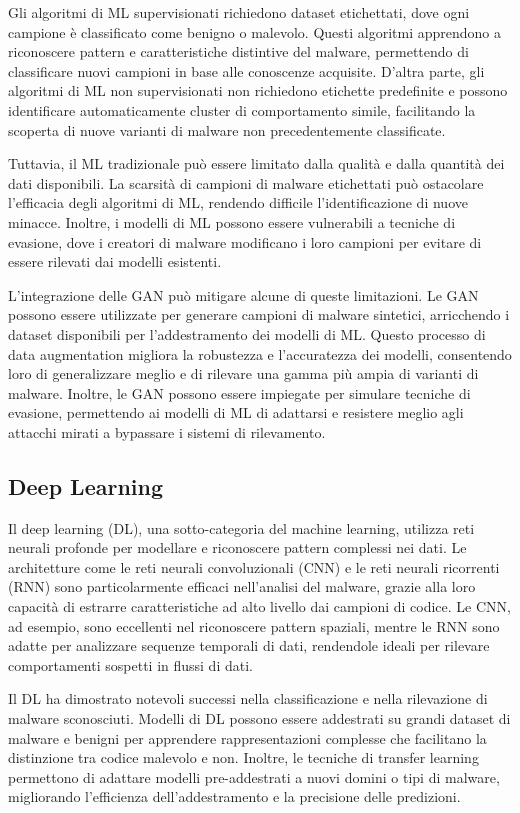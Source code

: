 Gli algoritmi di ML supervisionati richiedono dataset etichettati, dove ogni campione è classificato come benigno o malevolo. Questi algoritmi apprendono a riconoscere pattern e caratteristiche distintive del malware, permettendo di classificare nuovi campioni in base alle conoscenze acquisite. D'altra parte, gli algoritmi di ML non supervisionati non richiedono etichette predefinite e possono identificare automaticamente cluster di comportamento simile, facilitando la scoperta di nuove varianti di malware non precedentemente classificate.

Tuttavia, il ML tradizionale può essere limitato dalla qualità e dalla quantità dei dati disponibili. La scarsità di campioni di malware etichettati può ostacolare l'efficacia degli algoritmi di ML, rendendo difficile l'identificazione di nuove minacce. Inoltre, i modelli di ML possono essere vulnerabili a tecniche di evasione, dove i creatori di malware modificano i loro campioni per evitare di essere rilevati dai modelli esistenti.

L'integrazione delle GAN può mitigare alcune di queste limitazioni. Le GAN possono essere utilizzate per generare campioni di malware sintetici, arricchendo i dataset disponibili per l'addestramento dei modelli di ML. Questo processo di data augmentation migliora la robustezza e l'accuratezza dei modelli, consentendo loro di generalizzare meglio e di rilevare una gamma più ampia di varianti di malware. Inoltre, le GAN possono essere impiegate per simulare tecniche di evasione, permettendo ai modelli di ML di adattarsi e resistere meglio agli attacchi mirati a bypassare i sistemi di rilevamento.

\subsection{Deep Learning}

Il deep learning (DL), una sotto-categoria del machine learning, utilizza reti neurali profonde per modellare e riconoscere pattern complessi nei dati. Le architetture come le reti neurali convoluzionali (CNN) e le reti neurali ricorrenti (RNN) sono particolarmente efficaci nell'analisi del malware, grazie alla loro capacità di estrarre caratteristiche ad alto livello dai campioni di codice. Le CNN, ad esempio, sono eccellenti nel riconoscere pattern spaziali, mentre le RNN sono adatte per analizzare sequenze temporali di dati, rendendole ideali per rilevare comportamenti sospetti in flussi di dati.

Il DL ha dimostrato notevoli successi nella classificazione e nella rilevazione di malware sconosciuti. Modelli di DL possono essere addestrati su grandi dataset di malware e benigni per apprendere rappresentazioni complesse che facilitano la distinzione tra codice malevolo e non. Inoltre, le tecniche di transfer learning permettono di adattare modelli pre-addestrati a nuovi domini o tipi di malware, migliorando l'efficienza dell'addestramento e la precisione delle predizioni.

